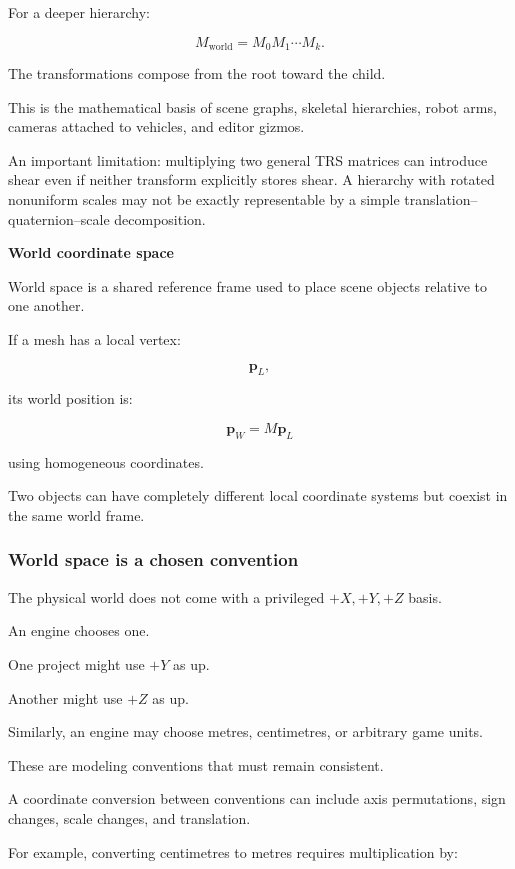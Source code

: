 For a deeper hierarchy:

\[
 M_{\mathrm{world}} = M_0M_1\cdots M_k.
\]

The transformations compose from the root toward the child.

This is the mathematical basis of scene graphs, skeletal hierarchies, robot arms, cameras attached to vehicles, and editor gizmos.

An important limitation: multiplying two general TRS matrices can introduce shear even if neither transform explicitly stores shear. A hierarchy with rotated nonuniform scales may not be exactly representable by a simple translation--quaternion--scale decomposition.

\textbf{World coordinate space}

World space is a shared reference frame used to place scene objects relative to one another.

If a mesh has a local vertex:

\[
 \mathbf p_L,
\]

its world position is:

\[
 \mathbf p_W=M\mathbf p_L
\]

using homogeneous coordinates.

Two objects can have completely different local coordinate systems but coexist in the same world frame.

\subsubsection{World space is a chosen convention}\label{02-foundations-ii-ch032-world-space-is-a-chosen-convention}

\hypertarget{02-foundations-ii-ch032-world-space-is-a-chosen-convention}{}

The physical world does not come with a privileged \(+X,+Y,+Z\) basis.

An engine chooses one.

One project might use \(+Y\) as up.

Another might use \(+Z\) as up.

Similarly, an engine may choose metres, centimetres, or arbitrary game units.

These are modeling conventions that must remain consistent.

A coordinate conversion between conventions can include axis permutations, sign changes, scale changes, and translation.

For example, converting centimetres to metres requires multiplication by:

